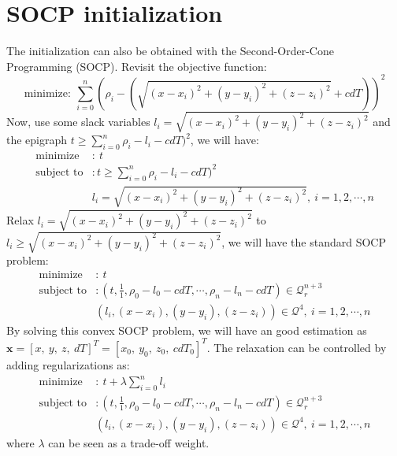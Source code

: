 \documentclass[a4paper]{report}
\begin{document}
\section{SOCP initialization}
The initialization can also be obtained with the Second-Order-Cone Programming (SOCP). Revisit the objective function:
\begin{equation}
\text{minimize}:\ \sum\limits_{i=0}^{n}{\left(\rho_i - (\sqrt{(x-x_i)^2+(y-y_i)^2+(z-z_i)^2}+cdT)\right)^2} 
\end{equation}
Now, use some slack variables $l_i=\sqrt{(x-x_i)^2+(y-y_i)^2+(z-z_i)^2}$ and the epigraph $t \geq \sum\limits_{i=0}^{n}{\rho_i - l_i - cdT)^2}$, we will have:
\begin{align}
\text{minimize}&:\ t \nonumber \\
\text{subject to}&: t \geq \sum\limits_{i=0}^{n}{\rho_i - l_i - cdT)^2} \\
& l_i=\sqrt{(x-x_i)^2+(y-y_i)^2+(z-z_i)^2}, \ i=1,2,\cdots,n \nonumber 
\end{align}
Relax  $l_i=\sqrt{(x-x_i)^2+(y-y_i)^2+(z-z_i)^2}$  to  $l_i\geq\sqrt{(x-x_i)^2+(y-y_i)^2+(z-z_i)^2}$, we will have the standard SOCP problem:
\begin{align}
\text{minimize}&:\ t \nonumber \\
\text{subject to}&: 
(t,\frac{1}{1},\rho_0 - l_0 - cdT,\cdots,\rho_n - l_n - cdT) \in \mathcal{Q}_r^{n+3} \\
& (l_i,(x-x_i),(y-y_i),(z-z_i)) \in \mathcal{Q}^{4}, \ i=1,2,\cdots,n \nonumber 
\end{align}
By solving this convex SOCP problem, we will have an good estimation as $\mathbf{x} = [x,\ y,\ z,\ dT]^T = [x_0,\ y_0,\ z_0,\ cdT_0]^T$. The relaxation can be controlled by adding regularizations as:
\begin{align}
\text{minimize}&:\ t+\lambda\sum\limits_{i=0}^{n}{l_i} \nonumber \\
\text{subject to}&: 
(t,\frac{1}{1},\rho_0 - l_0 - cdT,\cdots,\rho_n - l_n - cdT) \in \mathcal{Q}_r^{n+3} \\
& (l_i,(x-x_i),(y-y_i),(z-z_i)) \in \mathcal{Q}^{4}, \ i=1,2,\cdots,n \nonumber 
\end{align}
where $\lambda$ can be seen as a trade-off weight.
\end{document}
